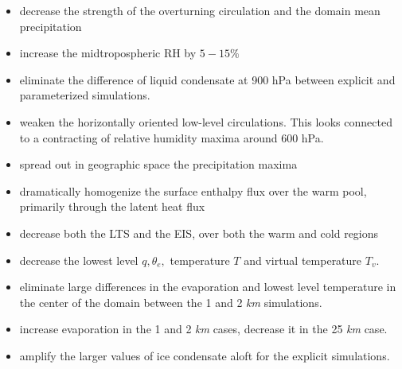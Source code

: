 \documentclass[11pt]{article}   	%
\begin{document}
\begin{itemize}
  \item decrease the strength of the overturning circulation and the domain mean precipitation
  \item increase the midtropospheric RH by $5-15 \% $
  \item eliminate the difference of liquid condensate at 900 hPa between explicit and parameterized simulations.
  \item weaken the horizontally oriented low-level circulations.   This looks connected to a contracting of relative 
           humidity maxima around 600 hPa.
  \item spread out in geographic space the precipitation maxima
  \item dramatically homogenize the surface enthalpy flux over the warm pool, primarily through the latent heat flux
  \item decrease both the LTS and the EIS, over both the warm and cold regions
  \item decrease the lowest level $q, \theta_e,$ temperature $T$ and virtual temperature $T_v$.  
  \item eliminate large differences in the evaporation and lowest level temperature in the center of the domain between 
           the 1 and 2 \textit{km} simulations. 
  \item increase evaporation in the 1 and 2 \textit{km} cases, decrease it in the 25 \textit{km} case.
  \item amplify the larger values of ice condensate aloft for the explicit simulations.  
\end{itemize}

%
\end{document}

